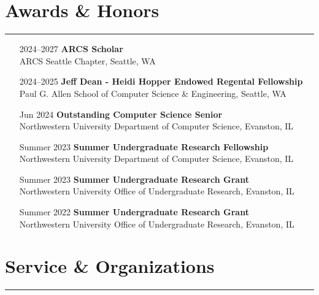 \documentclass{article}
\begin{document}
\section*{Awards \& Honors}
\hrule
\vspace{10pt}

\begin{itemize}[leftmargin=1.5in]
    \item[2024–2027] \textbf{ARCS Scholar}\\
    ARCS Seattle Chapter, Seattle, WA
    \item[2024–2025] \textbf{Jeff Dean - Heidi Hopper Endowed Regental Fellowship}\\
    Paul G. Allen School of Computer Science \& Engineering, Seattle, WA
    \item[Jun 2024] \textbf{Outstanding Computer Science Senior}\\
    Northwestern University Department of Computer Science, Evanston, IL
    \item[Summer 2023] \textbf{Summer Undergraduate Research Fellowship}\\
    Northwestern University Department of Computer Science, Evanston, IL
    \item[Summer 2023] \textbf{Summer Undergraduate Research Grant}\\
    Northwestern University Office of Undergraduate Research, Evanston, IL
    \item[Summer 2022] \textbf{Summer Undergraduate Research Grant}\\
    Northwestern University Office of Undergraduate Research, Evanston, IL
\end{itemize}

\section*{Service \& Organizations}
\hrule
\vspace{10pt}
\end{document}
